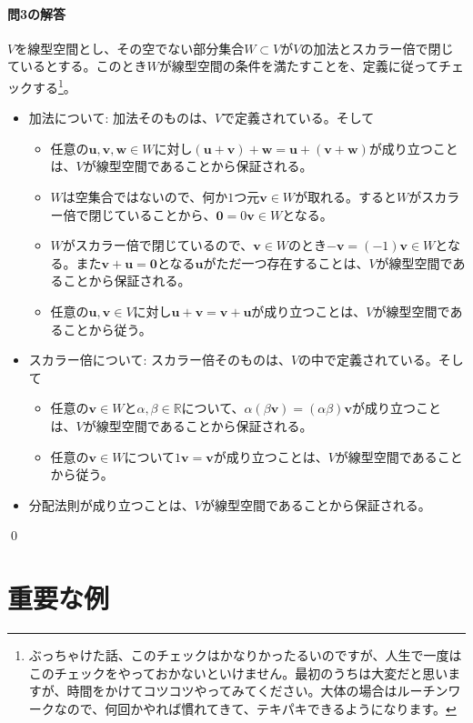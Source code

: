 \paragraph{問3の解答} $V$を線型空間とし、その空でない部分集合$W\subset V$が$V$の加法とスカラー倍で閉じているとする。このとき$W$が線型空間の条件を満たすことを、定義に従ってチェックする\footnote{ぶっちゃけた話、このチェックはかなりかったるいのですが、人生で一度はこのチェックをやっておかないといけません。最初のうちは大変だと思いますが、時間をかけてコツコツやってみてください。大体の場合はルーチンワークなので、何回かやれば慣れてきて、テキパキできるようになります。}。
\begin{itemize}
\item 加法について: 加法そのものは、$V$で定義されている。そして
\begin{itemize}
\item 任意の$\bm{u}, \bm{v}, \bm{w}\in W$に対し$(\bm{u} + \bm{v}) + \bm{w} = \bm{u} + (\bm{v} + \bm{w})$が成り立つことは、$V$が線型空間であることから保証される。
\item $W$は空集合ではないので、何か$1$つ元$\bm{v}\in W$が取れる。すると$W$がスカラー倍で閉じていることから、$\bm{0} = 0 \bm{v} \in W$となる。
\item $W$がスカラー倍で閉じているので、$\bm{v} \in W$のとき$-\bm{v} = (-1)\bm{v} \in W$となる。また$\bm{v} + \bm{u} = \bm{0}$となる$\bm{u}$がただ一つ存在することは、$V$が線型空間であることから保証される。
\item 任意の$\bm{u}, \bm{v}\in V$に対し$\bm{u} + \bm{v} = \bm{v} + \bm{u}$が成り立つことは、$V$が線型空間であることから従う。
\end{itemize}
\item スカラー倍について: スカラー倍そのものは、$V$の中で定義されている。そして
\begin{itemize}
\item 任意の$\bm{v} \in W$と$\alpha, \beta \in \mathbb{R}$について、$\alpha(\beta \bm{v}) = (\alpha\beta)\bm{v}$が成り立つことは、$V$が線型空間であることから保証される。
\item 任意の$\bm{v} \in W$について$1\bm{v} = \bm{v}$が成り立つことは、$V$が線型空間であることから従う。
\end{itemize}
\item 分配法則が成り立つことは、$V$が線型空間であることから保証される。
\end{itemize}
\qed

\section{重要な例}

